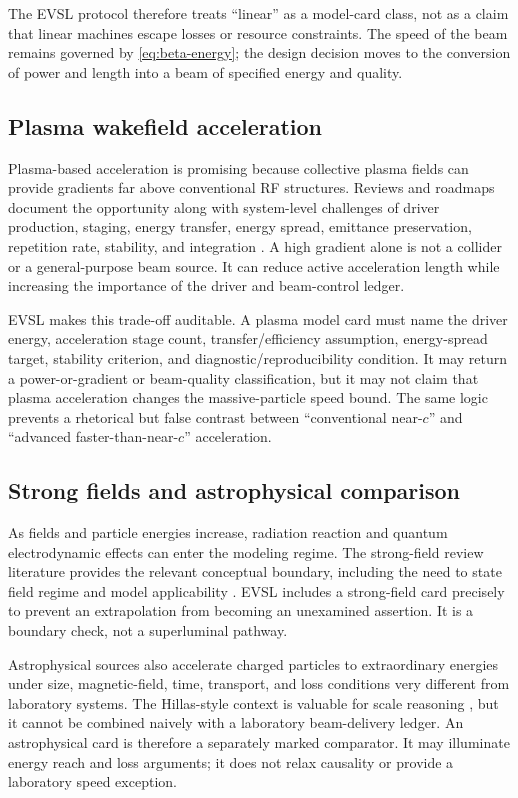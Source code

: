 \documentclass[conference]{../../../../Conference-LaTeX-template_10-17-19/IEEEtran}
\begin{document}
The EVSL protocol therefore treats ``linear'' as a model-card class, not as a claim that linear machines escape losses or resource constraints. The speed of the beam remains governed by \eqref{eq:beta-energy}; the design decision moves to the conversion of power and length into a beam of specified energy and quality.

\subsection{Plasma wakefield acceleration}
Plasma-based acceleration is promising because collective plasma fields can provide gradients far above conventional RF structures. Reviews and roadmaps document the opportunity along with system-level challenges of driver production, staging, energy transfer, energy spread, emittance preservation, repetition rate, stability, and integration \cite{bingham2003,schroeder2010,albert2020}. A high gradient alone is not a collider or a general-purpose beam source. It can reduce active acceleration length while increasing the importance of the driver and beam-control ledger.

EVSL makes this trade-off auditable. A plasma model card must name the driver energy, acceleration stage count, transfer/efficiency assumption, energy-spread target, stability criterion, and diagnostic/reproducibility condition. It may return a power-or-gradient or beam-quality classification, but it may not claim that plasma acceleration changes the massive-particle speed bound. The same logic prevents a rhetorical but false contrast between ``conventional near-$c$'' and ``advanced faster-than-near-$c$'' acceleration.

\subsection{Strong fields and astrophysical comparison}
As fields and particle energies increase, radiation reaction and quantum electrodynamic effects can enter the modeling regime. The strong-field review literature provides the relevant conceptual boundary, including the need to state field regime and model applicability \cite{gonoskov2022}. EVSL includes a strong-field card precisely to prevent an extrapolation from becoming an unexamined assertion. It is a boundary check, not a superluminal pathway.

Astrophysical sources also accelerate charged particles to extraordinary energies under size, magnetic-field, time, transport, and loss conditions very different from laboratory systems. The Hillas-style context is valuable for scale reasoning \cite{hillas2005}, but it cannot be combined naively with a laboratory beam-delivery ledger. An astrophysical card is therefore a separately marked comparator. It may illuminate energy reach and loss arguments; it does not relax causality or provide a laboratory speed exception.
\end{document}
